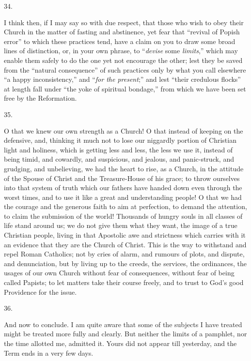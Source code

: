 34.

I think then, if I may say so with due respect,
that those who wish to obey their Church in the matter of fasting and
abstinence, yet fear that ``revival of Popish error'' to which these
practices tend, have a claim on you to draw some broad lines of
distinction, or, in your own phrase, to ``\emph{devise} some \emph{limits},''
which may enable them safely to do the one yet not encourage the
other; lest they be saved from the ``natural consequence'' of such
practices only by what you call elsewhere ``a happy inconsistency,'' and
``\emph{for the present};'' and lest ``their credulous flocks'' at
length fall under ``the yoke of spiritual bondage,'' from which we have
been set free by the Reformation.

35.

O that we knew our own strength as a Church! O
that instead of keeping on the defensive, and, thinking it much not to
lose our niggardly portion of Christian light and holiness, which is
getting less and less, the less we use it, instead of being timid, and
cowardly, and suspicious, and jealous, and panic-struck, and grudging,
and unbelieving, we had the heart to rise, as a Church, in the
attitude of the Spouse of Christ and the Treasure-House of his grace;
to throw ourselves into that system of truth which our fathers have
handed down even through the worst times, and to use it like a great
and understanding people! O that we had the courage and the generous
faith to aim at perfection, to demand the attention, to claim the
submission of the world! Thousands of hungry souls in all classes of
life stand around us; we do not give them what they want, the image of
a true Christian people, living in that Apostolic awe and strictness
which carries with it an evidence that they are the Church of Christ.
This is the way to withstand and repel Roman Catholics; not by cries
of alarm, and rumours of plots, and dispute, and denunciation, but by
living up to the creeds, the services, the ordinances, the usages of
our own Church without fear of consequences, without fear of being
called Papists; to let matters take their course freely, and to trust
to God's good Providence for the issue.

36.

And now to conclude. I am quite aware that some
of the subjects I have treated might be treated more fully and
clearly. But neither the limits of a pamphlet, nor the time allotted
me, admitted it. Yours did not appear till yesterday, and the Term
ends in a very few days.

